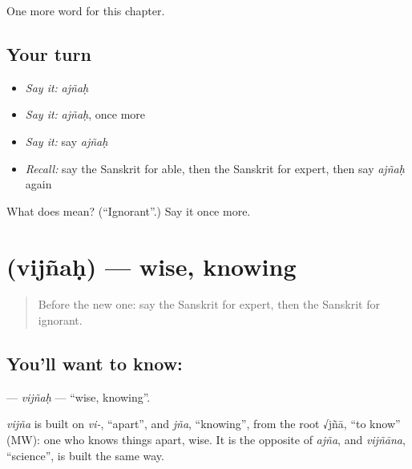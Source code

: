 \begin{grammarlens}[title={What you've built}]
One more word for this chapter.
\end{grammarlens}

\subsection*{Your turn}
\begin{itemize}
\raggedright
  \item \emph{Say it:} \emph{ajñaḥ}
  \item \emph{Say it:} \emph{ajñaḥ}, once more
  \item \emph{Say it:} say \emph{ajñaḥ}
  \item \emph{Recall:} say the Sanskrit for able, then the Sanskrit for expert, then say \emph{ajñaḥ} again
\end{itemize}

\begin{tcolorbox}[breakable,colback=teal!4,colframe=teal!35!black,title={Before you move on}]
What does  mean? (\textquotedblleft{}Ignorant\textquotedblright{}.) Say it once more.
\end{tcolorbox}
\section[\texorpdfstring{\sk{विज्ञः} (vijñaḥ)}{विज्ञः (vijñaḥ)}]{ (vijñaḥ) — wise, knowing}

\label{lesson:SA-C216-vijnah}



\begin{quote}
Before the new one: say the Sanskrit for expert, then the Sanskrit for ignorant.
\end{quote}

\subsection*{You'll want to know: }
\textbf{} — \emph{vijñaḥ} — \textquotedblleft{}wise, knowing\textquotedblright{}.

\begin{cousinweb}
\emph{vijña} is built on \emph{vi-}, \textquotedblleft{}apart\textquotedblright{}, and \emph{jña}, \textquotedblleft{}knowing\textquotedblright{}, from the root √jñā, \textquotedblleft{}to know\textquotedblright{} (MW): one who knows things apart, wise. It is the opposite of \emph{ajña}, and \emph{vijñāna}, \textquotedblleft{}science\textquotedblright{}, is built the same way.
\end{cousinweb}

